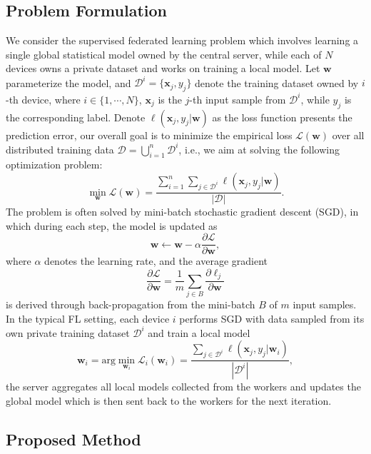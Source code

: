 \documentclass[10pt,twocolumn,letterpaper]{article}
\theoremstyle{definition}
\begin{document}
\subsection{Problem Formulation}
We consider the supervised federated learning problem which involves learning a single global statistical model owned by the central server, while each of $N$ devices owns a private dataset and works on training a local model. Let $\mathbf{w}$ parameterize the model, and $\mathcal{D}^i = \{\mathbf{x}_j, y_j\}$ denote the training dataset owned by $i$-th device, where $i\in\{1, \cdots, N\}$, $\mathbf{x}_j$ is the $j$-th input sample from $\mathcal{D}^i$, while $y_j$ is the corresponding label. Denote $\ell (\mathbf{x}_j, y_j | \mathbf{w})$ as the loss function presents the prediction error, our overall goal is to minimize the empirical loss $\mathcal{L}(\mathbf{w})$ over all distributed training data $\mathcal{D} = \bigcup_{i=1}^n \mathcal{D}^i$, i.e., we aim at solving the following optimization problem:
\[
\min\limits_\mathbf{w}  \mathcal{L}(\mathbf{w}) = \frac{ \sum_{i=1}^n \sum_{j\in \mathcal{D}^i} \ell (\mathbf{x}_j, y_j | \mathbf{w}) }{|\mathcal{D}|}.
\]
The problem is often solved by mini-batch stochastic gradient descent (SGD), in which during each step, the model is updated as $$\mathbf{w} \leftarrow \mathbf{w} - \alpha \dfrac{\partial \mathcal{L}}{\partial \mathbf{w}} ,$$ where $\alpha$ denotes the learning rate, and the average gradient $$\dfrac{\partial \mathcal{L}}{\partial \mathbf{w}}= \dfrac{1}{m} \sum_{j \in B} \dfrac{\partial \ell_j }{\partial \mathbf{w}} $$ is derived through back-propagation from the mini-batch $B$ of $m$ input samples. In the typical FL setting, each device $i$ performs SGD with data sampled from its own private training dataset $\mathcal{D}^i$ and train a local model $$\mathbf{w}_i = \text{arg}\min\limits_{\mathbf{w}_i} \mathcal{L}_i(\mathbf{w}_i) = \frac{ \sum_{j\in \mathcal{D}^i} \ell (\mathbf{x}_j, y_j | \mathbf{w}_i) }{|\mathcal{D}^i|} ,$$ 
the server aggregates all local models collected from the workers and updates the global model which is then sent back to the workers for the next iteration. 

\subsection{Proposed Method} \label{sec:our_method}

\end{document}
